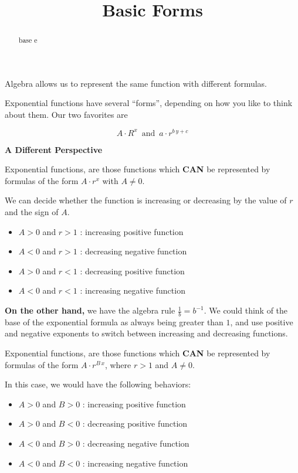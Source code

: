 \documentclass{ximera}
\title{Basic Forms}
\begin{document}
\begin{abstract}
base e
\end{abstract}
\maketitle





Algebra allows us to represent the same function with different formulas.

Exponential functions have several ``forms'', depending on how you like to think about them. Our two favorites are

\[     A \cdot R^x \, \text{ and }  \, a \cdot r^{b \, y + c}   \]



\textbf{\textcolor{blue!55!black}{A Different Perspective}} 


Exponential functions, are those functions which \textbf{\textcolor{red!70!black}{CAN}} be represented by formulas of the form $A \cdot r^x$ with $A \ne 0$.  


We can decide whether the function is increasing or decreasing by the value of $r$ and the sign of $A$. 



\begin{itemize}
\item $A > 0$ and $r > 1$ : increasing positive function
\item $A < 0$ and $r > 1$ : decreasing negative function  
\item $A > 0$ and $r < 1$ : decreasing positive function
\item $A < 0$ and $r < 1$ : increasing negative function  
\end{itemize}



\textbf{On the other hand,} we have the algebra rule $\frac{1}{b} = b^{-1}$.  We could think of the base of the exponential formula as always being greater than $1$, and use positive and negative exponents to switch between increasing and decreasing functions. 


Exponential functions, are those functions which \textbf{\textcolor{red!70!black}{CAN}} be represented by formulas of the form $A \cdot r^{B \, x}$, where $r > 1$ and $A \ne 0$.  


In this case, we would have the following behaviors: 


\begin{itemize}
\item $A > 0$ and $B > 0$ : increasing positive function
\item $A > 0$ and $B < 0$ : decreasing positive function
\item $A < 0$ and $B > 0$ : decreasing negative function  
\item $A < 0$ and $B < 0$ : increasing negative function  
\end{itemize}
\end{document}
